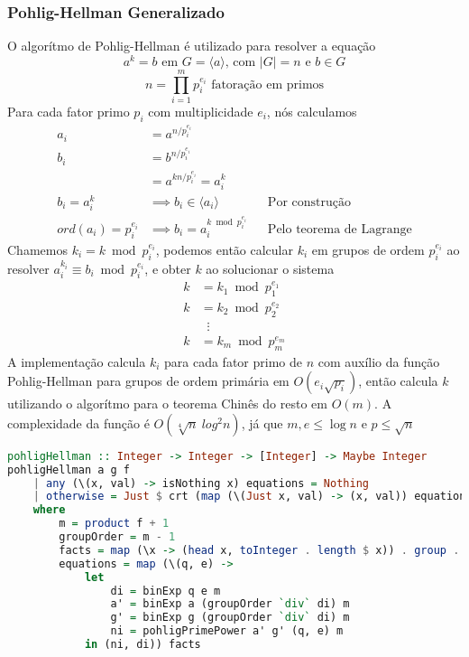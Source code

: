 \documentclass{article}
\begin{document}
\subsubsection{Pohlig-Hellman Generalizado}
O algorítmo de Pohlig-Hellman é utilizado para resolver a equação
$$ a^k = b \text{ em } G = \langle a \rangle\text{, com }|G| = n\text{ e }b \in G$$
$$ n = \prod_{i=1}^{m}p_i^{e_i} \text{ fatoração em primos} $$
Para cada fator primo $p_i$ com multiplicidade $e_i$, nós calculamos
\begin{align*}
    a_i &= a^{n/p_i^{e_i}}\\
    b_i &= b^{n/p_i^{e_i}}\\
        &= a^{k n/p_i^{e_i}} = a_i^k\\
    b_i = a_i^k &\implies b_i \in \langle a_i \rangle            &&\text{Por construção}\\
    ord(a_i) = p_i^{e_i} &\implies b_i = a_i^{k \bmod p_i^{e_i}} &&\text{Pelo teorema de Lagrange}
\end{align*}
Chamemos $ k_i = k \bmod p_i^{e_i} $, podemos então calcular $k_i$ em grupos de ordem $p_i^{e_i}$ ao resolver $a_i^{k_i} \equiv b_i \bmod p_i^{e_i}$, e obter $k$ ao solucionar o sistema
\begin{align*}
    k &= k_1 \bmod p_1^{e_1} \\
    k &= k_2 \bmod p_2^{e_2} \\
    &\;\;\vdots \\
    k &= k_m \bmod p_m^{e_m}
\end{align*}
A implementação calcula $k_i$ para cada fator primo de $n$ com auxílio da função Pohlig-Hellman para grupos de ordem primária em $O(e_i\sqrt{p_i})$, então calcula $k$ utilizando o algorítmo para o teorema Chinês do resto em $O(m)$.
A complexidade da função é $O(\sqrt[4]{n}\ log^2{n})$, já que $m, e \leq \log{n}$ e $p \leq \sqrt{n}$

\noindent\hspace{0.03\linewidth}
\begin{minipage}{.9\linewidth}
\begin{lstlisting}[language=haskell,caption=Pohlig Hellman]
pohligHellman :: Integer -> Integer -> [Integer] -> Maybe Integer
pohligHellman a g f
    | any (\(x, val) -> isNothing x) equations = Nothing
    | otherwise = Just $ crt (map (\(Just x, val) -> (x, val)) equations)
    where
        m = product f + 1
        groupOrder = m - 1
        facts = map (\x -> (head x, toInteger . length $ x)) . group . factorize $ groupOrder
        equations = map (\(q, e) ->
            let
                di = binExp q e m
                a' = binExp a (groupOrder `div` di) m
                g' = binExp g (groupOrder `div` di) m
                ni = pohligPrimePower a' g' (q, e) m
            in (ni, di)) facts
\end{lstlisting}
\end{minipage}
\end{document}
